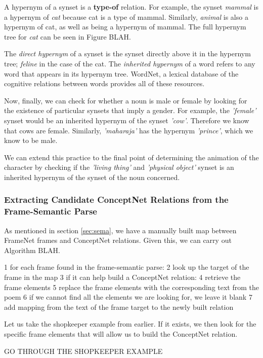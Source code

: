 A hypernym of a synset is a \textbf{type-of} relation. For example, the synset \textit{mammal} is a hypernym of \textit{cat} because cat is a type of mammal. Similarly, \textit{animal} is also a hypernym of cat, as well as being a hypernym of mammal. The full hypernym tree for \textit{cat} can be seen in Figure BLAH. 

The \textit{direct hypernym} of a synset is the synset directly above it in the hypernym tree; \textit{feline} in the case of the cat. The \textit{inherited hypernym} of a word refers to any word that appears in its hypernym tree. WordNet, a lexical database of the cognitive relations between words provides all of these resources.

Now, finally, we can check for whether a noun is male or female by looking for the existence of particular synsets that imply a gender. For example, the \textit{'female'} synset would be an inherited hypernym of the synset \textit{'cow'}. Therefore we know that cows are female. Similarly, \textit{'maharaja'} has the hypernym \textit{'prince'}, which we know to be male.

We can extend this practice to the final point of determining the animation of the character by checking if the \textit{'living thing'} and \textit{'physical object'} synset is an inherited hypernym of the synset of the noun concerned.


\subsubsection{Extracting Candidate ConceptNet Relations from the Frame-Semantic Parse}
\label{sec:candidate}

As mentioned in section \ref{sec:sema}, we have a manually built map between FrameNet frames and ConceptNet relations. Given this, we can carry out Algorithm BLAH.

1 for each frame found in the frame-semantic parse:
2	look up the target of the frame in the map
3	if it can help build a ConceptNet relation:	
4		retrieve the frame elements
5		replace the frame elements with the corresponding text from the poem
6			if we cannot find all the elements we are looking for, we leave it blank
7		add mapping from the text of the frame target to the newly built relation
	
Let us take the shopkeeper example from earlier. If it exists, we then look for the specific frame elements that will allow us to build the ConceptNet relation.

GO THROUGH THE SHOPKEEPER EXAMPLE


